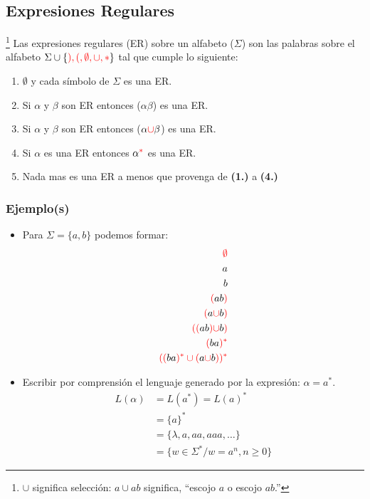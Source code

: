 \subsection{Expresiones Regulares}
{\let\thefootnote\relax\footnote{{$\cup$ significa selección: $a\cup ab$ significa, ``escojo $a$ o escojo $ab$.''}}}
Las expresiones regulares (ER) sobre un alfabeto ($\Sigma$) son las palabras sobre el alfabeto $\Sigma \cup \{{\color{red} ), (, \emptyset, \cup,*}\}$ tal que cumple lo siguiente:
\renewcommand{\labelenumi}{\theenumi}
\renewcommand{\theenumi}{\textbf{\arabic {enumi}.)}}%
\begin{enumerate}
\item {\color{red}$\emptyset$} y cada símbolo de $\Sigma$ es una ER.
\item Si $\alpha$ y $\beta$ son ER entonces {\color{red}(}$\alpha\beta${\color{red})} es una ER.
\item Si $\alpha$ y $\beta$ son ER entonces {\color{red}(}$\alpha{\color{red}\cup}\beta${\color{red})} es una ER.
\item Si $\alpha$ es una ER entonces $\alpha^{{\color{red}*}}$ es una ER.
\item Nada mas es una ER a menos que provenga de \textbf{(1.)} a \textbf{(4.)}
\end{enumerate}
\subsubsection*{Ejemplo(s)}
\begin{itemize}
\item Para $\Sigma = \{ a,b \}$ podemos formar:
\begin{align*}
{{\color{red}\emptyset}}\\
a\\
b\\
{{\color{red}(}}ab{{\color{red})}}\\
{{\color{red}(}}a{\color{red}\cup}b{{\color{red})}}\\
{{\color{red}(}}{\color{red}(}ab{\color{red})}{\color{red}\cup}b{{\color{red})}}\\
{{\color{red}(}}ba{{\color{red})^*}}\\
{\color{red}((}ba{\color{red})^*\cup(}a{\color{red}\cup}b{\color{red}))^*}
\end{align*}
\item Escribir por comprensión el lenguaje generado por la expresión: $\alpha = a^*$.
\begin{align*}
L(\alpha )& = L(a^*) = L(a)^* \\
	    & = \{ a\}^* \\
	    & = \{ \lambda , a ,aa, aaa,\ldots \} \\
	    & = \{ w \in\Sigma^* / w=a^n , n\geq 0\}
\end{align*}
\end{itemize}

